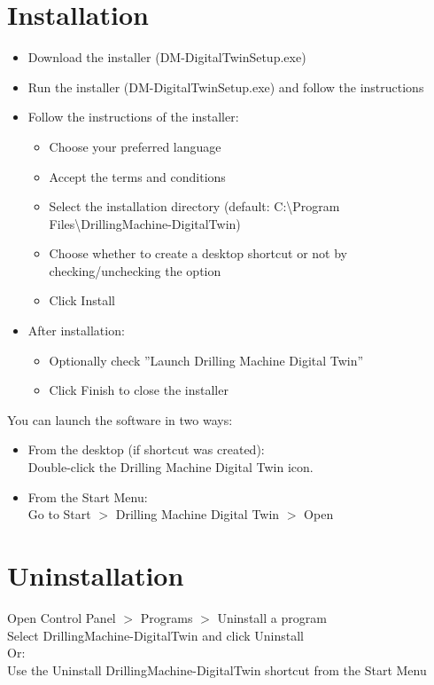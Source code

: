 \documentclass{article}
\begin{document}
\section{Installation}\hfill
\begin{itemize}
    \item Download the installer (DM-DigitalTwinSetup.exe)
    \item Run the installer (DM-DigitalTwinSetup.exe) and follow the instructions
    \item Follow the instructions of the installer:
    \begin{itemize}
        \item Choose your preferred language
        \item Accept the terms and conditions
        \item Select the installation directory (default: C:\textbackslash{}Program Files\textbackslash{}DrillingMachine-DigitalTwin)
        \item Choose whether to create a desktop shortcut or not by checking/unchecking the option
        \item Click Install 
    \end{itemize}
    \item After installation:
    \begin{itemize}
        \item Optionally check ”Launch Drilling Machine Digital Twin”
        \item Click Finish to close the installer
    \end{itemize}
\end{itemize}
You can launch the software in two ways:
\begin{itemize}
    \item From the desktop (if shortcut was created):\\Double-click the Drilling Machine Digital Twin icon.
    \item From the Start Menu:\\Go to Start $>$ Drilling Machine Digital Twin $>$ Open
\end{itemize}





\section{Uninstallation}\hfill

\noindent Open Control Panel $>$ Programs $>$ Uninstall a program\\
Select DrillingMachine-DigitalTwin and click Uninstall\\
Or:\\
Use the Uninstall DrillingMachine-DigitalTwin shortcut from the Start Menu
\end{document}
